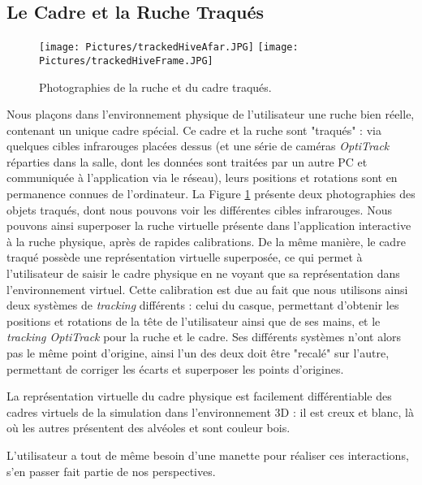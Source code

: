 		\subsection{Le Cadre et la Ruche Traqués}		
		
		\begin{figure}
		\centering
		\texttt{[image: Pictures/trackedHiveAfar.JPG]}
		\texttt{[image: Pictures/trackedHiveFrame.JPG]}
		\caption{Photographies de la ruche et du cadre traqués.}
		\label{photoTracked}
		\end{figure}	
		
		Nous plaçons dans l'environnement physique de l'utilisateur une ruche bien réelle, contenant un unique cadre spécial. Ce cadre et la ruche sont "traqués" : via quelques cibles infrarouges placées dessus (et une série de caméras \textit{OptiTrack} réparties dans la salle, dont les données sont traitées par un autre PC et communiquée à l'application via le réseau), leurs positions et rotations sont en permanence connues de l'ordinateur. La Figure \ref{photoTracked} présente deux photographies des objets traqués, dont nous pouvons voir les différentes cibles infrarouges. Nous pouvons ainsi superposer la ruche virtuelle présente dans l'application interactive à la ruche physique, après de rapides calibrations. De la même manière, le cadre traqué possède une représentation virtuelle superposée, ce qui permet à l'utilisateur de saisir le cadre physique en ne voyant que sa représentation dans l'environnement virtuel. Cette calibration est due au fait que nous utilisons ainsi deux systèmes de \textit{tracking} différents : celui du casque, permettant d'obtenir les positions et rotations de la tête de l'utilisateur ainsi que de ses mains, et le \textit{tracking OptiTrack} pour la ruche et le cadre. Ses différents systèmes n'ont alors pas le même point d'origine, ainsi l'un des deux doit être "recalé" sur l'autre, permettant de corriger les écarts et superposer les points d'origines.
		
		La représentation virtuelle du cadre physique est facilement différentiable des cadres virtuels de la simulation dans l'environnement 3D : il est creux et blanc, là où les autres présentent des alvéoles et sont couleur bois.
		
		L'utilisateur a tout de même besoin d'une manette pour réaliser ces interactions, s'en passer fait partie de nos perspectives.	
		
